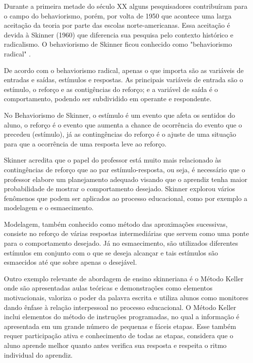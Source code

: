 Durante a primeira metade do século XX alguns pesquisadores contribuíram para o campo do behaviorismo, porém, por volta de 1950 que acontece uma larga aceitação da teoria por parte das escolas norte-americanas. Essa aceitação é devida à Skinner (1960) que diferencia sua pesquisa pelo contexto histórico e radicalismo. O behaviorismo de Skinner ficou conhecido como "behaviorismo radical" \cite{fragelli2010, silva2005}.

De acordo com o behaviorismo radical, apenas o que importa são as variáveis de entradas e saídas, estímulos e respostas. As principais variáveis de entrada são o estímulo, o reforço e as contigências do reforço; e a variável de saída é o comportamento, podendo ser subdividido em operante e respondente.

No Behaviorismo de Skinner, o estímulo é um evento que afeta os sentidos do aluno, o reforço é o evento que aumenta a chance de ocorrência do evento que o precedeu (estímulo), já as contingências do reforço é o ajuste de uma situação para que a ocorrência de uma resposta leve ao reforço.

Skinner acredita que o papel do professor está muito mais relacionado às contingências de reforço que ao par estímulo-resposta, ou seja, é necessário que o professor elabore um planejamento adequado visando que o aprendiz tenha maior probabilidade de mostrar o comportamento desejado. Skinner explorou vários fenômenos que podem ser aplicados ao processo educacional, como por exemplo a modelagem e o esmaecimento.

Modelagem, também conhecido como método das aproximações sucessivas, consiste no reforço de várias respostas intermediárias que servem como uma ponte para o comportamento desejado. Já no esmaecimento, são utilizados diferentes estímulos em conjunto com o que se deseja alcançar e tais estímulos são esmaecidos até que sobre apenas o desejável.

Outro exemplo relevante de abordagem de ensino skinneriana é o Método Keller onde são apresentadas aulas teóricas e demonstrações como elementos motivacionais, valoriza o poder da palavra escrita e utiliza alunos como monitores dando ênfase à relação interpessoal no processo educacional. O Método Keller inclui elementos do método de instruções programadas, no qual a informação é apresentada em um grande número de pequenas e fáceis etapas. Esse também requer participação ativa e conhecimento de todas as etapas, considera que o aluno aprende melhor quanto antes verifica sua resposta e respeita o ritmo individual do aprendiz.

